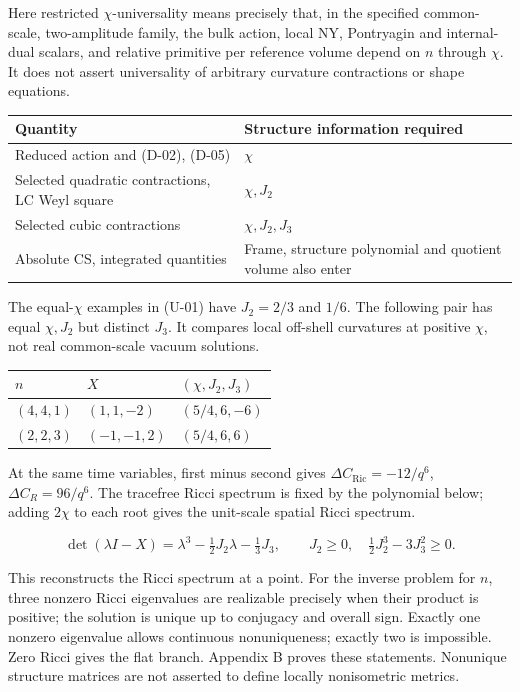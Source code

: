Here restricted $\chi$-universality means precisely that, in the specified common-scale, two-amplitude family, the bulk action, local NY, Pontryagin and internal-dual scalars, and relative primitive per reference volume depend on $n$ through $\chi$. It does not assert universality of arbitrary curvature contractions or shape equations.

\begin{center}\small
\begin{tabularx}{\textwidth}{@{}lX@{}}
\toprule
Quantity & Structure information required\\\midrule
Reduced action and (D-02), (D-05) & $\chi$\\
Selected quadratic contractions, LC Weyl square & $\chi,J_2$\\
Selected cubic contractions & $\chi,J_2,J_3$\\
Absolute CS, integrated quantities & Frame, structure polynomial and quotient volume also enter\\
\bottomrule\end{tabularx}\end{center}

The equal-$\chi$ examples in (U-01) have $J_2=2/3$ and $1/6$. The following pair has equal $\chi,J_2$ but distinct $J_3$. It compares local off-shell curvatures at positive $\chi$, not real common-scale vacuum solutions.

\begin{center}\small
\begin{tabularx}{\textwidth}{@{}llX@{}}
\toprule
$n$ & $X$ & $(\chi,J_2,J_3)$\\\midrule
$(4,4,1)$ & $(1,1,-2)$ & $(5/4,6,-6)$\\
$(2,2,3)$ & $(-1,-1,2)$ & $(5/4,6,6)$\\
\bottomrule\end{tabularx}\end{center}

At the same time variables, first minus second gives $\Delta C_{\mathrm{Ric}}=-12/q^6$, $\Delta C_R=96/q^6$. The tracefree Ricci spectrum is fixed by the polynomial below; adding $2\chi$ to each root gives the unit-scale spatial Ricci spectrum.

\begin{equation}\tag{I-05}\label{eq:I-05}
\det(\lambda I-X)=\lambda^3-\tfrac12J_2\lambda-\tfrac13J_3,\qquad J_2\ge0,\quad \tfrac12J_2^3-3J_3^2\ge0.
\end{equation}

This reconstructs the Ricci spectrum at a point. For the inverse problem for $n$, three nonzero Ricci eigenvalues are realizable precisely when their product is positive; the solution is unique up to conjugacy and overall sign. Exactly one nonzero eigenvalue allows continuous nonuniqueness; exactly two is impossible. Zero Ricci gives the flat branch. Appendix B proves these statements. Nonunique structure matrices are not asserted to define locally nonisometric metrics.

